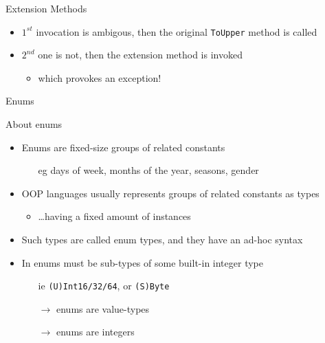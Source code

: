 \documentclass[presentation]{beamer}
\begin{document}
\begin{frame}[allowframebreaks]{Extension Methods}
  \begin{itemize}
    \item $1^{st}$ invocation is ambigous, then the original \texttt{ToUpper} method is called
    \item $2^{nd}$ one is not, then the extension method is invoked
    \begin{itemize}
      \item which provokes an exception!
    \end{itemize}
  \end{itemize}

\end{frame}

\begin{frame}[allowframebreaks]{Enums}
  \begin{block}{About enums}
    \begin{itemize}
      \item Enums are fixed-size groups of related constants
      \begin{itemize}
        \item[eg] days of week, months of the year, seasons, gender  
      \end{itemize}

      \item OOP languages usually represents groups of related constants as types
      \begin{itemize}
        \item \ldots having a fixed amount of instances
      \end{itemize}

      \item Such types are called \alert{enum} types, and they have an ad-hoc syntax

      \item In \dotnet{} enums must be sub-types of some built-in integer type
      \begin{itemize}
        \item[ie] \texttt{(U)Int16/32/64}, or \texttt{(S)Byte}
        \item[$\rightarrow$] \dotnet enums are value-types
        \item[$\rightarrow$] \dotnet enums are integers 
      \end{itemize}
    \end{itemize}
  \end{block}


\end{frame}
\end{document}
